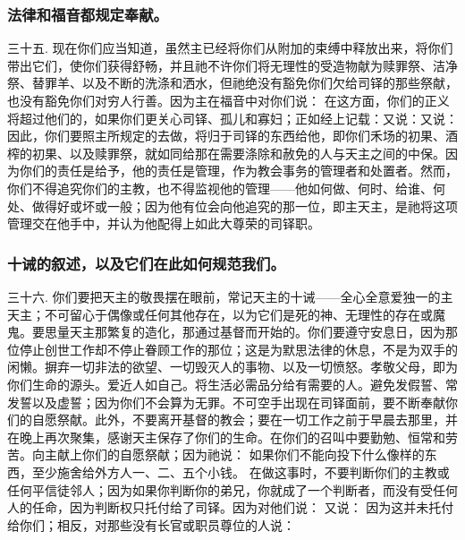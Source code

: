 
\subsubsection{法律和福音都规定奉献。}

三十五. 现在你们应当知道，虽然主已经将你们从附加的束缚中释放出来，将你们带出它们，使你们获得舒畅，并且祂不许你们将无理性的受造物献为赎罪祭、洁净祭、替罪羊、以及不断的洗涤和洒水，但祂绝没有豁免你们欠给司铎的那些祭献，也没有豁免你们对穷人行善。因为主在福音中对你们说： 在这方面，你们的正义将超过他们的，如果你们更关心司铎、孤儿和寡妇；正如经上记载：又说：又说：因此，你们要照主所规定的去做，将归于司铎的东西给他，即你们禾场的初果、酒榨的初果、以及赎罪祭，就如同给那在需要涤除和赦免的人与天主之间的中保。因为你们的责任是给予，他的责任是管理，作为教会事务的管理者和处置者。然而，你们不得追究你们的主教，也不得监视他的管理——他如何做、何时、给谁、何处、做得好或坏或一般；因为他有位会向他追究的那一位，即主天主，是祂将这项管理交在他手中，并认为他配得上如此大尊荣的司铎职。\par


\subsubsection{十诫的叙述，以及它们在此如何规范我们。}

三十六. 你们要把天主的敬畏摆在眼前，常记天主的十诫——全心全意爱独一的主天主；不可留心于偶像或任何其他存在，以为它们是死的神、无理性的存在或魔鬼。要思量天主那繁复的造化，那通过基督而开始的。你们要遵守安息日，因为那位停止创世工作却不停止眷顾工作的那位；这是为默思法律的休息，不是为双手的闲懒。摒弃一切非法的欲望、一切毁灭人的事物、以及一切愤怒。孝敬父母，即为你们生命的源头。爱近人如自己。将生活必需品分给有需要的人。避免发假誓、常发誓以及虚誓；因为你们不会算为无罪。不可空手出现在司铎面前，要不断奉献你们的自愿祭献。此外，不要离开基督的教会；要在一切工作之前于早晨去那里，并在晚上再次聚集，感谢天主保存了你们的生命。在你们的召叫中要勤勉、恒常和劳苦。向主献上你们的自愿祭献；因为祂说： 如果你们不能向投下什么像样的东西，至少施舍给外方人一、二、五个小钱。 在做这事时，不要判断你们的主教或任何平信徒邻人；因为如果你判断你的弟兄，你就成了一个判断者，而没有受任何人的任命，因为判断权只托付给了司铎。因为对他们说： 又说： 因为这并未托付给你们；相反，对那些没有长官或职员尊位的人说：\par

